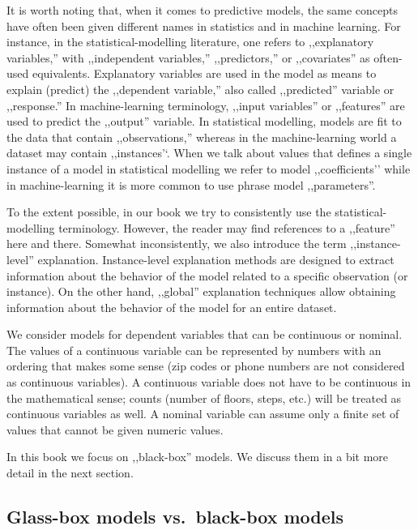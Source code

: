 \documentclass[12pt,]{krantz}
\begin{document}
It is worth noting that, when it comes to predictive models, the same concepts have often been given different names in statistics and in machine learning. For instance, in the statistical-modelling literature, one refers to ,,explanatory variables,'' with ,,independent variables,'' ,,predictors,'' or ,,covariates'' as often-used equivalents. Explanatory variables are used in the model as means to explain (predict) the ,,dependent variable,'' also called ,,predicted'' variable or ,,response.'' In machine-learning terminology, ,,input variables'' or ,,features'' are used to predict the ,,output'' variable. In statistical modelling, models are fit to the data that contain ,,observations,'' whereas in the machine-learning world a dataset may contain ,,instances'`. When we talk about values that defines a single instance of a model in statistical modelling we refer to model ,,coefficients'' while in machine-learning it is more common to use phrase model ,,parameters''.

To the extent possible, in our book we try to consistently use the statistical-modelling terminology. However, the reader may find references to a ,,feature'' here and there. Somewhat inconsistently, we also introduce the term ,,instance-level'' explanation. Instance-level explanation methods are designed to extract information about the behavior of the model related to a specific observation (or instance). On the other hand, ,,global'' explanation techniques allow obtaining information about the behavior of the model for an entire dataset.

We consider models for dependent variables that can be continuous or nominal. The values of a continuous variable can be represented by numbers with an ordering that makes some sense (zip codes or phone numbers are not considered as continuous variables). A continuous variable does not have to be continuous in the mathematical sense; counts (number of floors, steps, etc.) will be treated as continuous variables as well. A nominal variable can assume only a finite set of values that cannot be given numeric values.

In this book we focus on ,,black-box'' models. We discuss them in a bit more detail in the next section.

\hypertarget{glass-box-models-vs.black-box-models}{%
\subsection{Glass-box models vs.~black-box models}\label{glass-box-models-vs.black-box-models}}
\end{document}
